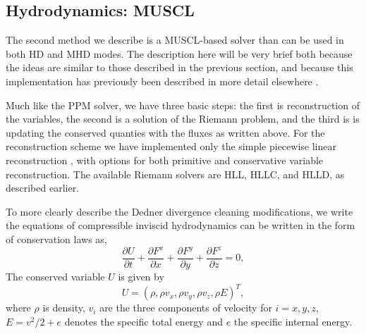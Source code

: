 \subsection{Hydrodynamics: MUSCL}
\label{sec.num.hydro-muscl}

The second method we describe is a MUSCL-based solver than can be used in both HD and MHD modes.  The description here will be very brief both because the ideas are similar to those described in the previous section, and because this implementation has previously
been described in more detail elsewhere \citep{WangAbelZhang08, WangAbel09}.

Much like the PPM solver, we have three basic steps: the first is
reconstruction of the variables, the second is a solution of the
Riemann problem, and the third is is updating the conserved quanties
with the fluxes as written above.
For the reconstruction scheme we have implemented only the simple
piecewise linear reconstruction \citep{1979JCoPh..32..101V, 1985JCoPh..59..264C},
with options for both primitive and conservative variable reconstruction.
The available Riemann solvers are HLL, HLLC, and HLLD, as described earlier.

To more clearly describe the Dedner divergence cleaning modifications, we write the equations of compressible inviscid hydrodynamics can be written in the form of conservation laws as,
\begin{equation}
 \frac{\partial{U}}{\partial{t}} +
 \frac{\partial{F^x}}{\partial{x}} + \frac{\partial{F^y}}{\partial{y}} + \frac{\partial{F^z}}{\partial{z}}= 0, \label{hydro}
\end{equation}
The conserved variable $U$ is given by
\begin{equation}
 U = (\rho, \rho v_x, \rho v_y, \rho v_z, \rho E)^{T},
\end{equation} 
where $\rho$ is density, $v_i$ are the three components of velocity
for $i={x,y,z}$, $E=v^2/2 + e$ denotes the specific total energy and $e$ the
specific internal energy.

